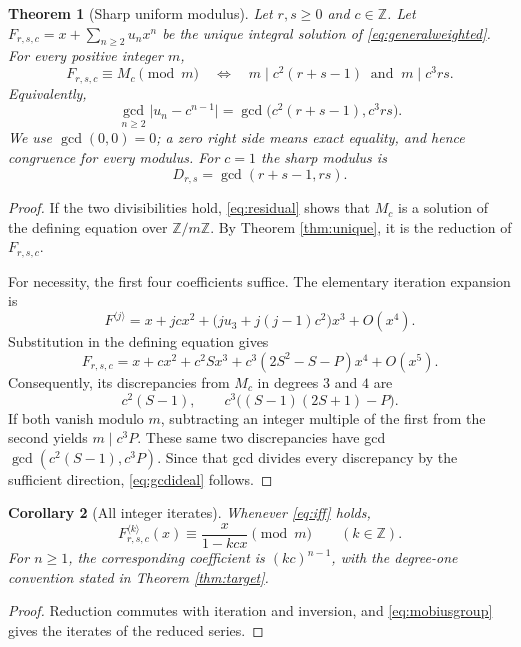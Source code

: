 \documentclass[11pt,letterpaper]{article}
\newtheorem{theorem}{Theorem}[section]
\newtheorem{corollary}[theorem]{Corollary}
\theoremstyle{definition}
\theoremstyle{remark}
\newcommand{\Z}{\mathbb Z}
\newcommand{\iter}[2]{#1^{\langle #2\rangle}}
\begin{document}
\begin{theorem}[Sharp uniform modulus]\label{thm:sharp}
Let $r,s\geq0$ and $c\in\Z$.  Let
$F_{r,s,c}=x+\sum_{n\geq2}u_nx^n$ be the unique integral solution of
\eqref{eq:generalweighted}.  For every positive integer $m$,
\begin{equation}\label{eq:iff}
 F_{r,s,c}\equiv M_c\pmod m
 \quad\Longleftrightarrow\quad
 m\mid c^2(r+s-1)\ \text{ and }\ m\mid c^3rs.
\end{equation}
Equivalently,
\begin{equation}\label{eq:gcdideal}
 \gcd_{n\geq2}\bigl|u_n-c^{n-1}\bigr|
 =\gcd\bigl(c^2(r+s-1),c^3rs\bigr).
\end{equation}
We use $\gcd(0,0)=0$; a zero right side means exact equality, and hence
congruence for every modulus.  For $c=1$ the sharp modulus is
\begin{equation}\label{eq:D}
 D_{r,s}=\gcd(r+s-1,rs).
\end{equation}
\end{theorem}
\begin{proof}
If the two divisibilities hold, \eqref{eq:residual} shows that $M_c$ is
a solution of the defining equation over $\Z/m\Z$.  By
Theorem \ref{thm:unique}, it is the reduction of $F_{r,s,c}$.

For necessity, the first four coefficients suffice.  The elementary
iteration expansion is
\[
 \iter{F}{j}=x+jc x^2+
   \bigl(j u_3+j(j-1)c^2\bigr)x^3+O(x^4).
\]
Substitution in the defining equation gives
\begin{equation}\label{eq:firstfour}
 F_{r,s,c}=x+c x^2+c^2Sx^3+
          c^3(2S^2-S-P)x^4+O(x^5).
\end{equation}
Consequently, its discrepancies from $M_c$ in degrees $3$ and $4$ are
\[
 c^2(S-1),\qquad
 c^3\bigl((S-1)(2S+1)-P\bigr).
\]
If both vanish modulo $m$, subtracting an integer multiple of the first
from the second yields $m\mid c^3P$.  These same two discrepancies have
gcd $\gcd(c^2(S-1),c^3P)$.  Since that gcd divides every discrepancy by
the sufficient direction, \eqref{eq:gcdideal} follows.
\end{proof}

\begin{corollary}[All integer iterates]\label{cor:iterates}
Whenever \eqref{eq:iff} holds,
\[
 \iter{F_{r,s,c}}{k}(x)\equiv\frac{x}{1-kcx}\pmod m
 \qquad(k\in\Z).
\]
For $n\geq1$, the corresponding coefficient is $(kc)^{n-1}$, with
the degree-one convention stated in Theorem \ref{thm:target}.
\end{corollary}
\begin{proof}
Reduction commutes with iteration and inversion, and
\eqref{eq:mobiusgroup} gives the iterates of the reduced series.
\end{proof}
\end{document}

